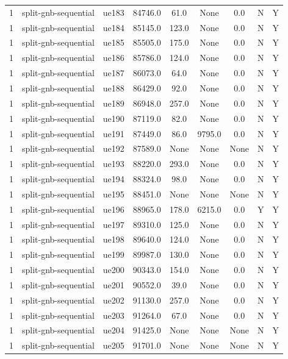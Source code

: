 \begin{table}[ht]
\begin{tabular}{|c|c|c|c|c|c|c|c|c|}
1 & split-gnb-sequential & ue183 & 84746.0 & 61.0 & None & 0.0 & N & Y \\
1 & split-gnb-sequential & ue184 & 85145.0 & 123.0 & None & 0.0 & N & Y \\
1 & split-gnb-sequential & ue185 & 85505.0 & 175.0 & None & 0.0 & N & Y \\
1 & split-gnb-sequential & ue186 & 85786.0 & 124.0 & None & 0.0 & N & Y \\
1 & split-gnb-sequential & ue187 & 86073.0 & 64.0 & None & 0.0 & N & Y \\
1 & split-gnb-sequential & ue188 & 86429.0 & 92.0 & None & 0.0 & N & Y \\
1 & split-gnb-sequential & ue189 & 86948.0 & 257.0 & None & 0.0 & N & Y \\
1 & split-gnb-sequential & ue190 & 87119.0 & 82.0 & None & 0.0 & N & Y \\
1 & split-gnb-sequential & ue191 & 87449.0 & 86.0 & 9795.0 & 0.0 & N & Y \\
1 & split-gnb-sequential & ue192 & 87589.0 & None & None & None & N & Y \\
1 & split-gnb-sequential & ue193 & 88220.0 & 293.0 & None & 0.0 & N & Y \\
1 & split-gnb-sequential & ue194 & 88324.0 & 98.0 & None & 0.0 & N & Y \\
1 & split-gnb-sequential & ue195 & 88451.0 & None & None & None & N & Y \\
1 & split-gnb-sequential & ue196 & 88965.0 & 178.0 & 6215.0 & 0.0 & Y & Y \\
1 & split-gnb-sequential & ue197 & 89310.0 & 125.0 & None & 0.0 & N & Y \\
1 & split-gnb-sequential & ue198 & 89640.0 & 124.0 & None & 0.0 & N & Y \\
1 & split-gnb-sequential & ue199 & 89987.0 & 130.0 & None & 0.0 & N & Y \\
1 & split-gnb-sequential & ue200 & 90343.0 & 154.0 & None & 0.0 & N & Y \\
1 & split-gnb-sequential & ue201 & 90552.0 & 39.0 & None & 0.0 & N & Y \\
1 & split-gnb-sequential & ue202 & 91130.0 & 257.0 & None & 0.0 & N & Y \\
1 & split-gnb-sequential & ue203 & 91264.0 & 67.0 & None & 0.0 & N & Y \\
1 & split-gnb-sequential & ue204 & 91425.0 & None & None & None & N & Y \\
1 & split-gnb-sequential & ue205 & 91701.0 & None & None & None & N & Y \\

\end{tabular}
\end{table}
